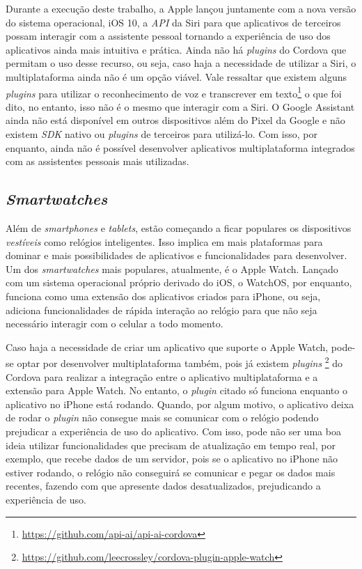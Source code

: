 Durante a execução deste trabalho, a Apple lançou juntamente com a nova versão do sistema operacional, iOS 10, a \textit{API} da Siri para que aplicativos de terceiros possam interagir com a assistente pessoal tornando 
a experiência de uso dos aplicativos ainda mais intuitiva e prática. Ainda não há \textit{plugins} do Cordova que permitam o uso desse recurso, ou seja, caso haja a necessidade de utilizar a Siri, o multiplataforma ainda 
não é um opção viável. Vale ressaltar que existem alguns \textit{plugins} para utilizar o reconhecimento de voz e transcrever em texto\footnote{\url{https://github.com/api-ai/api-ai-cordova}} o que foi dito, no entanto, 
isso não é o mesmo que interagir com a Siri. O Google Assistant ainda não está disponível em outros dispositivos além do Pixel da Google e não existem \textit{SDK} nativo ou \textit{plugins} de terceiros para utilizá-lo. 
Com isso, por enquanto, ainda não é possível desenvolver aplicativos multiplataforma integrados com as assistentes pessoais mais utilizadas.

\subsection{\textit{Smartwatches}} \label{subsec:facial}

Além de \textit{smartphones} e \textit{tablets}, estão começando a ficar populares os dispositivos \textit{vestíveis} como relógios inteligentes. Isso implica em mais plataformas para dominar 
e mais possibilidades de aplicativos e funcionalidades para desenvolver. Um dos \textit{smartwatches} mais populares, atualmente, é o Apple Watch. Lançado com um sistema operacional próprio derivado do iOS, o WatchOS, 
por enquanto, funciona como uma extensão dos aplicativos criados para iPhone, ou seja, adiciona funcionalidades de rápida interação ao relógio para que não seja necessário interagir com o celular a todo momento.

Caso haja a necessidade de criar um aplicativo que suporte o Apple Watch, pode-se optar por desenvolver multiplataforma também, pois já existem \textit{plugins}
\footnote{\url{https://github.com/leecrossley/cordova-plugin-apple-watch}} do Cordova para realizar a integração entre o aplicativo multiplataforma e a extensão para Apple Watch. No entanto, o \textit{plugin} 
citado só funciona enquanto o aplicativo no iPhone está rodando. Quando, por algum motivo, o aplicativo deixa de rodar o \textit{plugin} não consegue mais se comunicar com o relógio podendo prejudicar a experiência 
de uso do aplicativo. Com isso, pode não ser uma boa ideia utilizar funcionalidades que precisam de atualização em tempo real, por exemplo, que recebe dados de um servidor, pois se o aplicativo no iPhone não 
estiver rodando, o relógio não conseguirá se comunicar e pegar os dados mais recentes, fazendo com 
que apresente dados desatualizados, prejudicando a experiência de uso.


